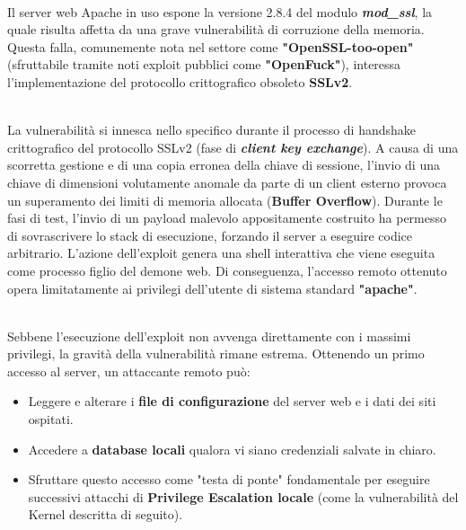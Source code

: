 \documentclass[12pt, a4paper]{article}
\begin{document}
    \vspace{0.5cm}
    \\ \vspace{0.15cm}
    Il server web Apache in uso espone la versione 2.8.4 del modulo \textit{\textbf{mod\_ssl}}, la quale risulta affetta da una grave vulnerabilità di corruzione della memoria. Questa falla, comunemente nota nel settore come \textbf{"OpenSSL-too-open"} (sfruttabile tramite noti exploit pubblici come \textbf{"OpenFuck"}), interessa l'implementazione del protocollo crittografico obsoleto \textbf{SSLv2}.

    \vspace{0.5cm}
    \\ \vspace{0.15cm}
    La vulnerabilità si innesca nello specifico durante il processo di handshake crittografico del protocollo SSLv2 (fase di \textit{\textbf{client key exchange}}). A causa di una scorretta gestione e di una copia erronea della chiave di sessione, l'invio di una chiave di dimensioni volutamente anomale da parte di un client esterno provoca un superamento dei limiti di memoria allocata (\textbf{Buffer Overflow}). Durante le fasi di test, l'invio di un payload malevolo appositamente costruito ha permesso di sovrascrivere lo stack di esecuzione, forzando il server a eseguire codice arbitrario. L'azione dell'exploit genera una shell interattiva che viene eseguita come processo figlio del demone web. Di conseguenza, l'accesso remoto ottenuto opera limitatamente ai privilegi dell'utente di sistema standard \textbf{"apache"}.

    \vspace{0.5cm}
    \\ \vspace{0.15cm}
    Sebbene l'esecuzione dell'exploit non avvenga direttamente con i massimi privilegi, la gravità della vulnerabilità rimane estrema. Ottenendo un primo accesso al server, un attaccante remoto può:
    \begin{itemize}
        \item Leggere e alterare i \textbf{file di configurazione} del server web e i dati dei siti ospitati.
        \item Accedere a \textbf{database locali} qualora vi siano credenziali salvate in chiaro.
        \item Sfruttare questo accesso come "testa di ponte" fondamentale per eseguire successivi attacchi di \textbf{Privilege Escalation locale} (come la vulnerabilità del Kernel descritta di seguito).
    \end{itemize}
\end{document}
